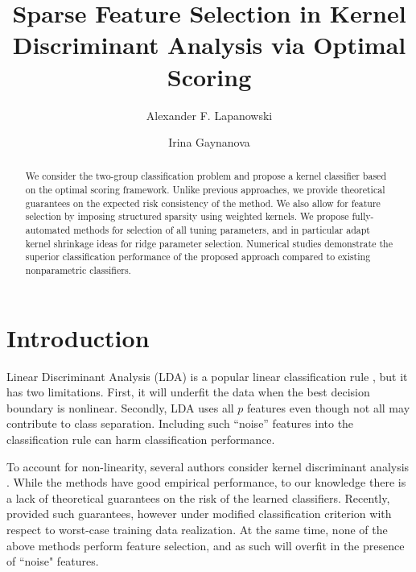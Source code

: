 \documentclass[twoside, onecolumn]{article}
\begin{document}
\title{Sparse Feature Selection in Kernel Discriminant Analysis via Optimal Scoring}

\author[]{Alexander F. Lapanowski}
\author[]{Irina Gaynanova}

\date{}
\maketitle





\begin{abstract}
 We consider the two-group classification problem and propose a kernel classifier based on the optimal scoring framework. Unlike previous approaches, we provide theoretical guarantees on the expected risk consistency of the method. We also allow for feature selection by imposing structured sparsity using weighted kernels. We propose fully-automated methods for selection of all tuning parameters, and in particular adapt kernel shrinkage ideas for ridge parameter selection. Numerical studies demonstrate the superior classification performance of the proposed approach compared to existing nonparametric classifiers. %
\end{abstract}



\section{Introduction}

Linear Discriminant Analysis (LDA) is a popular linear classification rule \cite[Section 4.3]{hastie_elements_2009}, but it has two limitations. First, it will underfit the data when the best decision boundary is nonlinear. 
Secondly, LDA uses all $p$ features even though not all may contribute to class separation.  Including such ``noise'' features into the classification rule can harm classification performance.

To account for non-linearity, several authors consider kernel discriminant analysis \cite{baudat2000generalized,mika_fisher_1999, roth2000nonlinear, bernhard_scholkopf_learning_2002}. While the methods have good empirical performance, to our knowledge there is a lack of theoretical guarantees on the risk of the learned classifiers. Recently, \cite{diethe2009matching, kim2006robust, lanckriet2002robust} provided such guarantees, however under modified classification criterion with respect to worst-case training data realization. At the same time, none of the above methods perform feature selection, and as such will overfit in the presence of ``noise" features.
\end{document}
